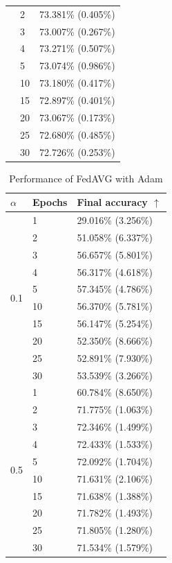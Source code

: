 \documentclass[conference,compsoc]{IEEEtran}
\begin{document}
\begin{table}[ht]
\begin{tabular}{lll}
    & 2 & 73.381\% (0.405\%) \\
    & 3 & 73.007\% (0.267\%) \\
    & 4 & 73.271\% (0.507\%) \\
    & 5 & 73.074\% (0.986\%) \\
    & 10 & 73.180\% (0.417\%) \\
    & 15 & 72.897\% (0.401\%) \\
    & 20 & 73.067\% (0.173\%) \\
    & 25 & 72.680\% (0.485\%) \\
    & 30 & 72.726\% (0.253\%) \\
    \hline
    \end{tabular}
\end{table}

\begin{table}[ht]
\centering
\caption{Performance of FedAVG with Adam}
    \centering
    \begin{tabular}{lll}
    \hline
    $\alpha$ & \textbf{Epochs} & \textbf{Final accuracy $\uparrow$} \\
    \hline
    \multirow{10}{*}{0.1} & 1 & 29.016\% (3.256\%) \\
    & 2 & 51.058\% (6.337\%) \\
    & 3 & 56.657\% (5.801\%) \\
    & 4 & 56.317\% (4.618\%) \\
    & 5 & 57.345\% (4.786\%) \\
    & 10 & 56.370\% (5.781\%) \\
    & 15 & 56.147\% (5.254\%) \\
    & 20 & 52.350\% (8.666\%) \\
    & 25 & 52.891\% (7.930\%) \\
    & 30 & 53.539\% (3.266\%) \\
    \hline
    \multirow{10}{*}{0.5} & 1 & 60.784\% (8.650\%) \\
    & 2 & 71.775\% (1.063\%) \\
    & 3 & 72.346\% (1.499\%) \\
    & 4 & 72.433\% (1.533\%) \\
    & 5 & 72.092\% (1.704\%) \\
    & 10 & 71.631\% (2.106\%) \\
    & 15 & 71.638\% (1.388\%) \\
    & 20 & 71.782\% (1.493\%) \\
    & 25 & 71.805\% (1.280\%) \\
    & 30 & 71.534\% (1.579\%) \\

\end{tabular}
\end{table}
\end{document}
